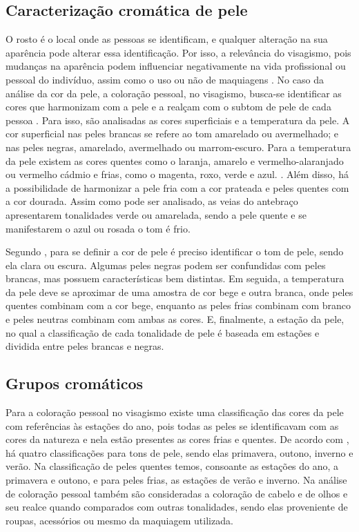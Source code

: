 \subsection{Caracterização cromática de pele}
O rosto é o local onde as pessoas se identificam, e qualquer alteração na sua aparência pode alterar essa identificação. Por isso, a relevância do visagismo, pois mudanças na aparência podem influenciar negativamente na vida profissional ou pessoal do indivíduo, assim como o uso ou não de maquiagens \cite{Respostas_Emocionais_Implícitas_Julgamento_da_Atratividade_Facial_em_Faces}. No caso da análise da cor da pele, a coloração pessoal, no visagismo, busca-se identificar as cores que harmonizam com a pele e a realçam com o subtom de pele de cada
pessoa \cite{A_influencia_da_coloração_pessoal_na_autoestima_e_autoimagem}. Para isso, são analisadas as cores superficiais e a temperatura da pele. A cor superficial nas peles brancas se refere ao tom amarelado ou avermelhado; e nas peles negras, amarelado, avermelhado ou marrom-escuro. Para a temperatura da pele existem as cores quentes como o laranja, amarelo e vermelho-alaranjado ou vermelho cádmio e frias, como o magenta, roxo, verde e azul. \cite{Visagismo}. Além disso, há a possibilidade de harmonizar a pele fria com a cor prateada e peles quentes com a cor dourada. Assim como pode ser analisado, as veias do antebraço apresentarem tonalidades verde ou amarelada, sendo a pele  quente e se manifestarem o azul ou rosada o tom é frio. 

Segundo \cite{Visagismo}, para se definir a cor de pele é preciso identificar o tom de pele, sendo ela clara ou escura. Algumas peles negras podem ser confundidas com peles brancas, mas possuem características bem distintas. Em seguida, a temperatura da pele deve se aproximar de uma amostra de cor bege e outra branca, onde peles quentes combinam com a cor bege, enquanto as peles frias combinam com branco e peles neutras combinam com ambas as cores. E,  finalmente, a estação da pele, no qual a classificação de cada tonalidade de pele é baseada em estações e dividida entre peles brancas e negras.

\subsection{Grupos cromáticos}
Para a coloração pessoal no visagismo existe uma classificação das cores da pele com referências às estações do ano, pois todas as peles se identificavam com as cores da natureza e nela estão presentes as cores frias e quentes. De acordo com \cite{Visagismo_Harmonia_e_Estetica}, há quatro classificações para tons de pele, sendo elas primavera, outono, inverno e verão. Na classificação de peles quentes temos, consoante as estações do ano, a primavera e outono, e para peles frias, as estações de verão e inverno. Na análise de coloração pessoal também são consideradas a coloração de cabelo e de olhos e seu realce quando comparados com outras tonalidades, sendo elas proveniente de roupas, acessórios ou mesmo da maquiagem utilizada.

